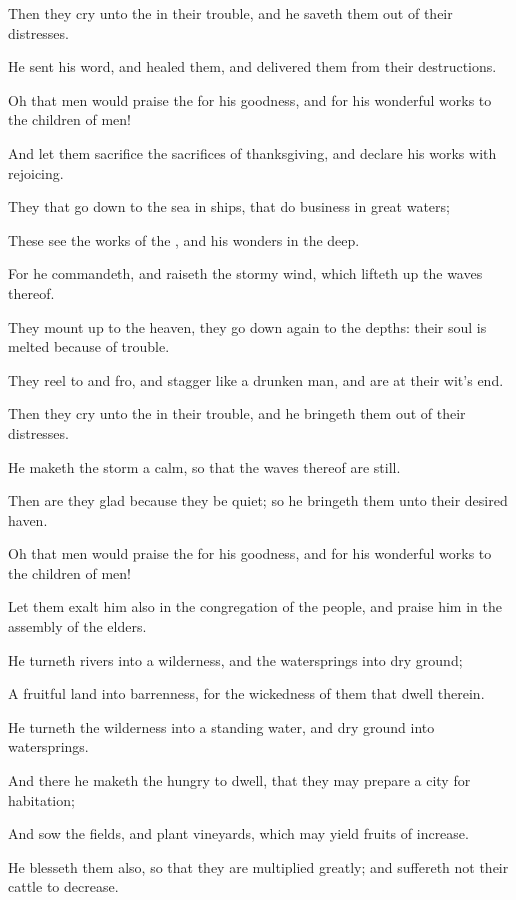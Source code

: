 \verse Then they cry unto the \LORD in their trouble, and he saveth them out of their distresses.

\verse He sent his word, and healed them, and delivered them from their destructions.

\verse Oh that men would praise the \LORD for his goodness, and for his wonderful works to the children of men!

\verse And let them sacrifice the sacrifices of thanksgiving, and declare his works with rejoicing.

\verse They that go down to the sea in ships, that do business in great waters;

\verse These see the works of the \LORD, and his wonders in the deep.

\verse For he commandeth, and raiseth the stormy wind, which lifteth up the waves thereof.

\verse They mount up to the heaven, they go down again to the depths: their soul is melted because of trouble.

\verse They reel to and fro, and stagger like a drunken man, and are at their wit's end.

\verse Then they cry unto the \LORD in their trouble, and he bringeth them out of their distresses.

\verse He maketh the storm a calm, so that the waves thereof are still.

\verse Then are they glad because they be quiet; so he bringeth them unto their desired haven.

\verse Oh that men would praise the \LORD for his goodness, and for his wonderful works to the children of men!

\verse Let them exalt him also in the congregation of the people, and praise him in the assembly of the elders.

\verse He turneth rivers into a wilderness, and the watersprings into dry ground;

\verse A fruitful land into barrenness, for the wickedness of them that dwell therein.

\verse He turneth the wilderness into a standing water, and dry ground into watersprings.

\verse And there he maketh the hungry to dwell, that they may prepare a city for habitation;

\verse And sow the fields, and plant vineyards, which may yield fruits of increase.

\verse He blesseth them also, so that they are multiplied greatly; and suffereth not their cattle to decrease.

